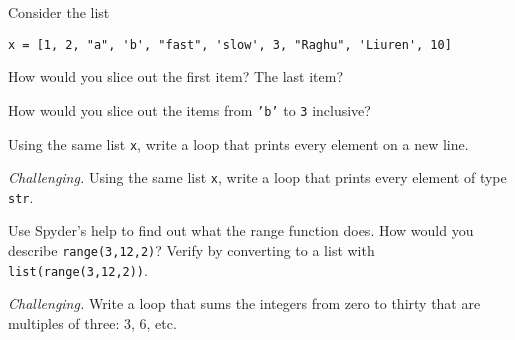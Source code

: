 \documentclass[11pt]{exam}
\begin{document}
\begin{questions}
\item Consider the list
\begin{verbatim}
x = [1, 2, "a", 'b', "fast", 'slow', 3, "Raghu", 'Liuren', 10]
\end{verbatim}
\begin{parts}
\item How would you slice out the first item?  The last item?
\item How would you slice out the items from {\tt 'b'} to {\tt 3} inclusive?
\end{parts}

\item Using the same list {\tt x}, write a loop that prints every element on a new line.

\item {\it Challenging.\/}
Using the same list {\tt x}, write a loop that prints every element of type {\tt str}.

\item Use Spyder's help to find out what the range function does.
How would you describe {\tt range(3,12,2)}?
Verify by converting to a list with {\tt list(range(3,12,2))}.

\item {\it Challenging.\/}
Write a loop that sums the integers from zero to thirty that are multiples of three:
3, 6, etc.


\begin{comment}
\item Suppose the current price of corn is \$1.20.
The price is set to increase by 10 cents every weekday until it hits \$2.50.
(Nothing happens on weekends.)
At that point it will switch directions and decrease by 10 cents a day.
Finish the code below to print the price of corn every day until it reaches \$2.50.
\begin{verbatim}
days = ["M", "T", "W", "Th", "F"]
starting_price = 1.20
current_price = starting_price
while True:
for day in days:
    current_price = current_price + 0.10
    print("The price on ", day, "is ", current_price)
if current_price == 2.50:
    break
\end{verbatim}
\end{comment}



\end{questions}
\end{document}
